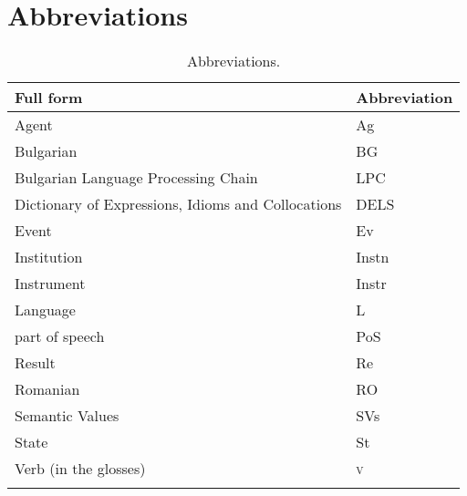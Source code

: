 \documentclass[output=paper]{langsci/langscibook}
\begin{document}
\section*{Abbreviations}

\begin{table}
\begin{tabular}{ll}
\lsptoprule
Full form  & Abbreviation \\
\midrule
Agent & Ag\\
Bulgarian & BG \\
Bulgarian Language Processing Chain & LPC \\
Dictionary of Expressions, Idioms and Collocations & DELS \\
Event & Ev\\
Institution & Instn\\
Instrument & Instr\\
Language & L\\
part of speech & PoS \\
Result & Re\\
Romanian & RO \\
Semantic Values & SVs\\
State & St\\
Verb (in the glosses) & \textsc{v} \\
\lspbottomrule
\end{tabular}
\caption{Abbreviations.}
\end{table}


\printbibliography[heading=subbibliography,notkeyword=this]
\end{document}
